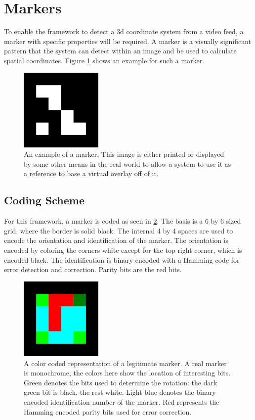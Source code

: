 \section{Markers}

To enable the framework to detect a 3d coordinate system from a video feed, a marker with specific properties will be required.
A marker is a visually significant pattern that the system can detect within an image and be used to calculate spatial coordinates. Figure \ref{fig:marker_example} shows an example for such a marker.

\begin{figure}
	\centering
	\includegraphics[width=4cm]{img/marker_example.png}
	\caption[Example Marker.]{An example of a marker. This image is either printed or displayed by some other means in the real world to allow a system to use it as a reference to base a virtual overlay off of it.}
	\label{fig:marker_example}
\end{figure}

\subsection{Coding Scheme}

For this framework, a marker is coded as seen in \ref{fig:marker_template}.
The basis is a 6 by 6 sized grid, where the border is solid black.
The internal 4 by 4 spaces are used to encode the orientation and identification of the marker.
The orientation is encoded by coloring the corners white except for the top right corner, which is encoded black.
The identification is binary encoded with a Hamming code for error detection and correction.
Parity bits are the red bits.

\begin{figure}
	\centering
	\includegraphics[width=4cm]{img/marker_template.png}
	\caption[Template Marker.]{A color coded representation of a legitimate marker. A real marker is monochrome, the colors here show the location of interesting bits. Green denotes the bits used to determine the rotation: the dark green bit is black, the rest white. Light blue denotes the binary encoded identification number of the marker. Red represents the Hamming encoded parity bits used for error correction.}
	\label{fig:marker_template}
\end{figure}

